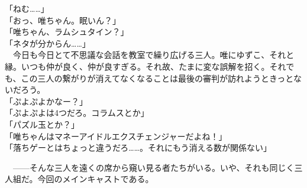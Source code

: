 
「ねむ……」\\
「おっ、唯ちゃん。眠いん？」\\
「唯ちゃん、ラムシュタイン？」\\
「ネタが分からん……」\\
　今日も今日とて不思議な会話を教室で繰り広げる三人。唯にゆずこ、それと縁。いつも仲が良く、仲が良すぎる。それ故、たまに変な誤解を招く。それでも、この三人の繋がりが消えてなくなることは最後の審判が訪れようときっとないだろう。\\
「ぷよぷよかなー？」\\
「ぷよぷよは4つだろ。コラムスとか」\\
「パズル玉とか？」\\
「唯ちゃんはマネーアイドルエクスチェンジャーだよね！」\\
「落ちゲーとはちょっと違うだろ……。それにもう消える数が関係ない」

　——そんな三人を遠くの席から窺い見る者たちがいる。いや、それも同じく三人組だ。今回のメインキャストである。\\

